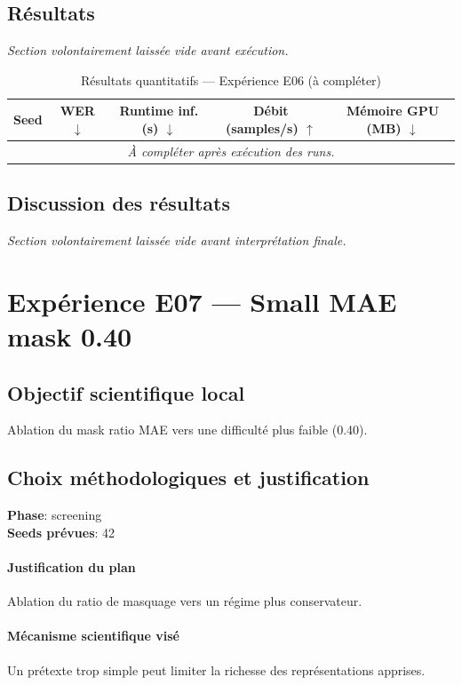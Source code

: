 \documentclass[11pt,a4paper]{article}
\begin{document}
\subsection{Résultats}
\textit{Section volontairement laissée vide avant exécution.}

\begin{table}[H]
\centering
\caption{Résultats quantitatifs --- Expérience E06 (à compléter)}
\begin{tabular}{lcccc}
\toprule
Seed & WER $\downarrow$ & Runtime inf. (s) $\downarrow$ & Débit (samples/s) $\uparrow$ & Mémoire GPU (MB) $\downarrow$ \\
\midrule
\multicolumn{5}{c}{\textit{À compléter après exécution des runs.}} \\
\bottomrule
\end{tabular}
\end{table}

\subsection{Discussion des résultats}
\textit{Section volontairement laissée vide avant interprétation finale.}


\section{Expérience E07 --- Small MAE mask 0.40}
\subsection{Objectif scientifique local}
Ablation du mask ratio MAE vers une difficulté plus faible (0.40).

\subsection{Choix méthodologiques et justification}
\textbf{Phase}: screening\\
\textbf{Seeds prévues}: 42\\


\paragraph{Justification du plan}
Ablation du ratio de masquage vers un régime plus conservateur.

\paragraph{Mécanisme scientifique visé}
Un prétexte trop simple peut limiter la richesse des représentations apprises.
\end{document}
